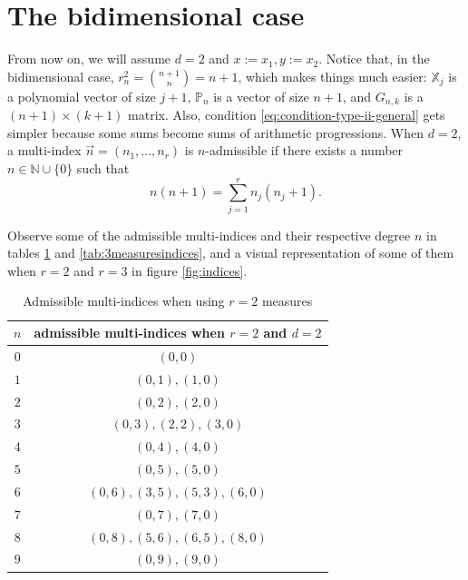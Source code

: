 \documentclass[12pt,a4]{report}
\theoremstyle{plain}
\newcommand{\N}[0]{\mathbb{N}}
\begin{document}
\section{The bidimensional case}

From now on, we will assume $d=2$ and $x:=x_1, y:=x_2$. Notice that, in the bidimensional case, $r^2_n = \binom{n+1}{n} = n+1$, which makes things much easier: $\mathbb X_j$ is a polynomial vector of size $j+1$, $\mathbb P_n$ is a vector of size $n+1$, and $G_{n,k}$ is a $(n+1)\times(k+1)$ matrix. Also, condition \eqref{eq:condition-type-ii-general} gets simpler because some sums become sums of arithmetic progressions. When $d=2$, a multi-index $\vec n =(n_1,\dots,n_r)$ is $n$-admissible if there exists a number $n\in\N\cup \{0\}$ such that
\begin{equation}
    \label{eq:condition-type-ii}
    n(n+1)=\sum_{j=1}^r n_j (n_j+1).
\end{equation} 

Observe some of the admissible multi-indices and their respective degree $n$ in tables \ref{tab:2measuresindices} and \ref{tab:3measuresindices}, and a visual representation of some of them when $r=2$ and $r=3$ in figure \ref{fig:indices}.

\begin{table}[h]
    \centering
    \begin{tabular}{|c|c|}
    \hline
    $n$ & admissible multi-indices when $r=2$ and $d=2$ \\ \hline
    $0$ & $(0,0)$                                  \\ \hline
    $1$ & $(0,1), (1,0)$                           \\ \hline
    $2$ & $(0, 2), (2, 0)$                         \\ \hline
    $3$ & $(0, 3), (2, 2), (3, 0)$                 \\ \hline
    $4$ & $(0, 4), (4, 0)$                         \\ \hline
    $5$ & $(0, 5), (5, 0)$                         \\ \hline
    $6$ & $(0, 6), (3, 5), (5, 3), (6, 0)$         \\ \hline
    $7$ & $(0, 7), (7, 0)$                         \\ \hline
    $8$ & $(0, 8), (5, 6), (6, 5), (8, 0)$         \\ \hline
    $9$ & $(0, 9), (9, 0)$                         \\ \hline
    \end{tabular}
    \caption{Admissible multi-indices when using $r=2$ measures}
    \label{tab:2measuresindices}
\end{table}
\end{document}

